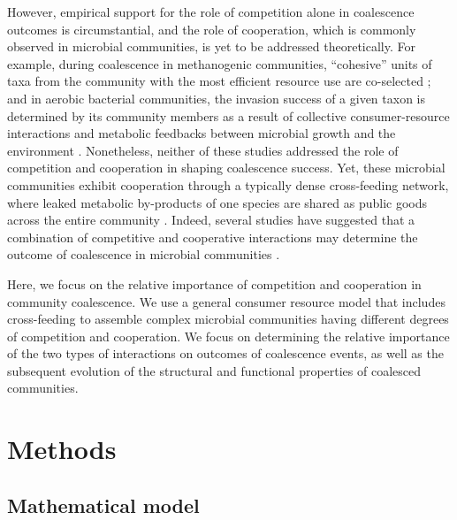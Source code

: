 \documentclass[10pt,letterpaper]{article}
\begin{document}
However, empirical support for the role of competition alone in coalescence outcomes is circumstantial, and the role of cooperation, which is commonly observed in microbial communities, is yet to be addressed theoretically. For example, during coalescence in methanogenic communities, ``cohesive'' units of taxa from the community with the most efficient resource use are co-selected \cite{Sierocinski2017}; and in aerobic bacterial communities, the invasion success of a given taxon is determined by its community members as a result of collective consumer-resource interactions and metabolic feedbacks between microbial growth and the environment \cite{Lu2018}. Nonetheless, neither of these studies addressed the role of competition and cooperation in shaping coalescence success. Yet, these microbial communities exhibit cooperation through a typically dense cross-feeding network, where leaked metabolic by-products of one species are shared as public goods across the entire community \cite{Hansen2007, Lawrence2012, Embree2015}. Indeed, several studies have suggested that a combination of competitive and cooperative interactions may determine the outcome of coalescence in microbial communities  \cite{Rivett2018, Albright2020, Castledine2020}. 

Here, we focus on the relative importance of competition and cooperation in community coalescence. We use a general consumer resource model that includes cross-feeding to assemble complex microbial communities having different degrees of competition and cooperation. We focus on determining the relative importance of the two types of interactions on outcomes of coalescence events, as well as the subsequent evolution of the structural and functional properties of coalesced communities. 

\section*{Methods}

\subsection*{Mathematical model}
\end{document}

